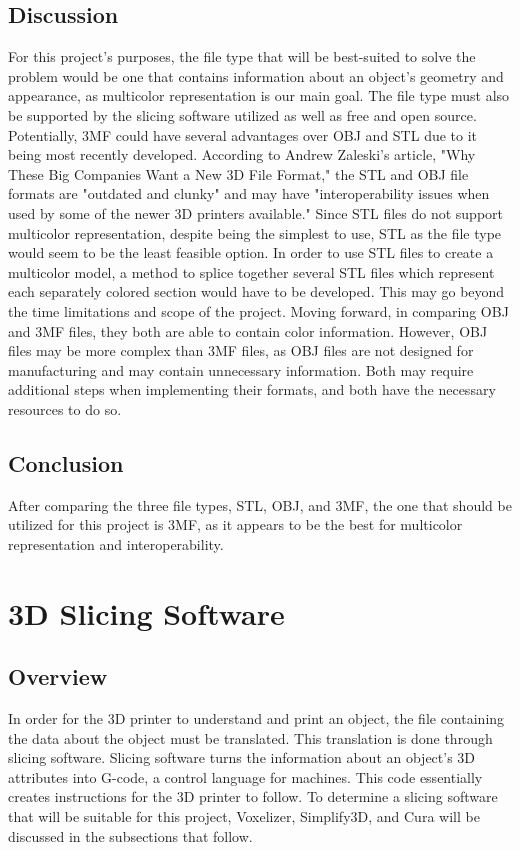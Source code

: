\documentclass[letterpaper, onecolumn, draftclsnofoot,10pt, compsoc]{IEEEtran}
\begin{document}
\subsection{Discussion}
For this project's purposes, the file type that will be best-suited to solve the problem would be one that contains information about an object's geometry and appearance, as multicolor representation is our main goal.
The file type must also be supported by the slicing software utilized as well as free and open source.
Potentially, 3MF could have several advantages over OBJ and STL due to it being most recently developed.
According to Andrew Zaleski's article, "Why These Big Companies Want a New 3D File Format," the STL and OBJ file formats are "outdated and clunky" and may have "interoperability issues when used by some of the newer 3D printers available." \cite{newformatweb}
Since STL files do not support multicolor representation, despite being the simplest to use, STL as the file type would seem to be the least feasible option.
In order to use STL files to create a multicolor model, a method to splice together several STL files which represent each separately colored section would have to be developed. This may go beyond the time limitations and scope of the project. 
Moving forward, in comparing OBJ and 3MF files, they both are able to contain color information.
However, OBJ files may be more complex than 3MF files, as OBJ files are not designed for manufacturing and may contain unnecessary information. \cite{3mfweb}
Both may require additional steps when implementing their formats, and both have the necessary resources to do so.

\subsection{Conclusion}
After comparing the three file types, STL, OBJ, and 3MF, the one that should be utilized for this project is 3MF, as it appears to be the best for multicolor representation and interoperability. 

\section{3D Slicing Software}
\subsection{Overview}
In order for the 3D printer to understand and print an object, the file containing the data about the object must be translated.
This translation is done through slicing software.
Slicing software turns the information about an object's 3D attributes into G-code, a control language for machines. 
This code essentially creates instructions for the 3D printer to follow. \cite{whatisweb}
To determine a slicing software that will be suitable for this project, Voxelizer, Simplify3D, and Cura will be discussed in the subsections that follow. 
\end{document}
